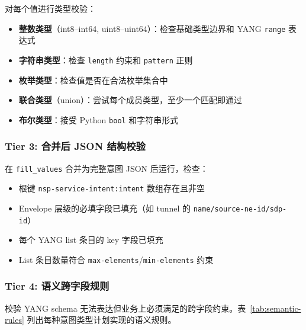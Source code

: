 \documentclass[12pt, a4paper]{article}
\newcommand{\yang}{\textsc{YANG}}
\newcommand{\fillvalues}{\texttt{fill\_values}}
\begin{document}
对每个值进行类型校验：

\begin{itemize}
  \item \textbf{整数类型}（int8--int64, uint8--uint64）：检查基础类型边界和 \yang{} \texttt{range} 表达式
  \item \textbf{字符串类型}：检查 \texttt{length} 约束和 \texttt{pattern} 正则
  \item \textbf{枚举类型}：检查值是否在合法枚举集合中
  \item \textbf{联合类型}（union）：尝试每个成员类型，至少一个匹配即通过
  \item \textbf{布尔类型}：接受 Python \texttt{bool} 和字符串形式
\end{itemize}

\subsubsection{Tier 3: 合并后 JSON 结构校验}

在 \fillvalues{} 合并为完整意图 JSON 后运行，检查：

\begin{itemize}
  \item 根键 \texttt{nsp-service-intent:intent} 数组存在且非空
  \item Envelope 层级的必填字段已填充（如 tunnel 的 \texttt{name/source-ne-id/sdp-id}）
  \item 每个 \yang{} list 条目的 key 字段已填充
  \item List 条目数量符合 \texttt{max-elements}/\texttt{min-elements} 约束
\end{itemize}

\subsubsection{Tier 4: 语义跨字段规则}

校验 \yang{} schema 无法表达但业务上必须满足的跨字段约束。表~\ref{tab:semantic-rules} 列出每种意图类型计划实现的语义规则。
\end{document}

